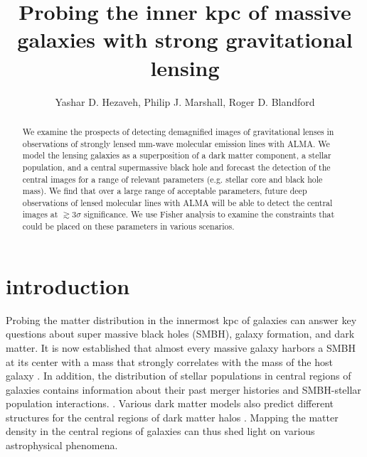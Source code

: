 \documentclass[chicago]{emulateapj}
\begin{document}
\title{Probing the inner kpc of massive galaxies with strong gravitational lensing}
\author{Yashar D. Hezaveh, Philip J. Marshall, Roger D. Blandford}  

\begin{abstract}  
\noindent
We examine the prospects of detecting demagnified images of gravitational lenses in observations of strongly lensed mm-wave molecular emission lines with ALMA. We model the lensing galaxies as a superposition of a dark matter component, a stellar population, and a central supermassive black hole and forecast the detection of the central images for a range of relevant parameters (e.g. stellar core and black hole mass).
We find that over a large range of acceptable parameters, future deep observations of lensed molecular lines with ALMA will be able to detect the central images at $\gtrsim 3\sigma$ significance. We use Fisher analysis to examine the  constraints that could be placed on these parameters in various scenarios. 

\end{abstract}






\section{introduction}
Probing the matter distribution in the innermost kpc of galaxies can answer key questions about super massive black holes (SMBH), galaxy formation, and dark matter. It is now established that almost every massive galaxy harbors a SMBH at its center with a mass that strongly correlates with the mass of the host galaxy \citep{Kormendy:95,Ferrarese:00,Gebhardt:00,Tremaine:02}.
In addition, the distribution of stellar populations in central regions of galaxies contains information about their past merger histories and SMBH-stellar population interactions. \citep[e.g][]{Barnes:92,Ebisuzaki:91}.  Various dark matter models also predict different structures for the central regions of dark matter halos \citep[e.g][]{Rocha:13}.  Mapping the matter density in the central regions of galaxies can thus shed light on various astrophysical phenomena.
\end{document}
